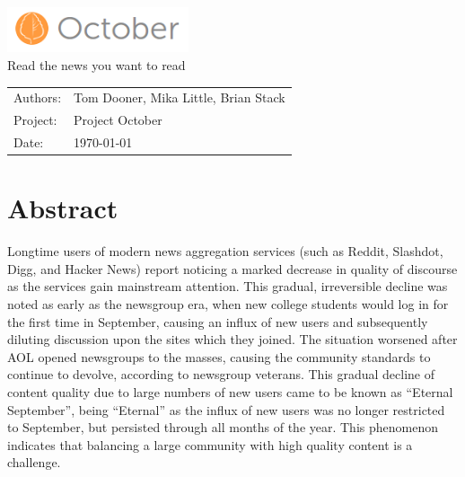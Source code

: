 \documentclass[11pt,letterpaper,titlepage]{article}
\begin{document}

\newpage
\fancyhf{}
\vspace*{6cm}
\begin{center}
\includegraphics[width=0.4\textwidth]{img/logo.png}\\
\textcolor{black!70}{Read the news you want to read}\\
\vspace{1cm}
\end{center}
\vfill
\begin{flushright}
\begin{tabular}{ll}
Authors: & Tom Dooner, Mika Little, Brian Stack\\
Project: & Project October\\
Date: & \today
\end{tabular}
\end{flushright}
\thispagestyle{empty}

\newpage
\pagestyle{fancy}
\fancyhf{}

\fancyhead[L]{\small \rm \textit{\rightmark}}
\fancyhead[R]{\small \rm \textbf{\thepage}}



\renewcommand{\sectionmark}[1]{\markright{\thesection.\ #1}}
\renewcommand{\headrulewidth}{0.5pt}
\renewcommand{\footrulewidth}{0.5pt}


\tableofcontents
\listoffigures

\newpage
\section{Abstract}

Longtime users of modern news aggregation services (such as Reddit, Slashdot, Digg, and Hacker News) report noticing a marked decrease in quality of discourse as the services gain mainstream attention.
This gradual, irreversible decline was noted as early as the newsgroup era, when new college students would log in for the first time in September, causing an influx of new users and subsequently diluting discussion upon the sites which they joined.
The situation worsened after AOL opened newsgroups to the masses, causing the community standards to continue to devolve, according to newsgroup veterans\cite{september}.
This gradual decline of content quality due to large numbers of new users came to be known as ``Eternal September'', being ``Eternal'' as the influx of new users was no longer restricted to September, but persisted through all months of the year. 
This phenomenon indicates that balancing a large community with high quality content is a challenge.
\end{document}
